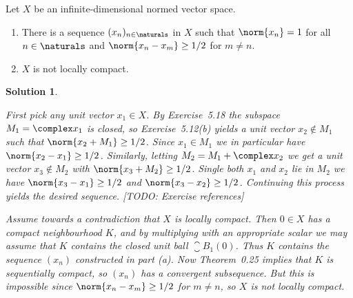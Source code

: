 \documentclass[article, a4paper, 11pt, oneside]{memoir}
\numberwithin{equation}{chapter}
\theoremstyle{nonumberplain}
\newtheorem{solution}{Solution}
\begin{document}
\begin{exerciseframed*}[19]
	Let $X$ be an infinite-dimensional normed vector space.
	\begin{enumerate}
		\item There is a sequence $(x_n)_{n\in\naturals}$ in $X$ such that $\norm{x_n} = 1$ for all $n \in \naturals$ and $\norm{x_n - x_m} \geq 1/2$ for $m \neq n$.
		\item $X$ is not locally compact.
	\end{enumerate}
\end{exerciseframed*}

\begin{solution}
\begin{solutionsec}
	\item First pick any unit vector $x_1 \in X$. By Exercise~5.18 the subspace $M_1 = \complex x_1$ is closed, so Exercise~5.12(b) yields a unit vector $x_2 \not\in M_1$ such that $\norm{x_2 + M_1} \geq 1/2$. Since $x_1 \in M_1$ we in particular have $\norm{x_2 - x_1} \geq 1/2$. Similarly, letting $M_2 = M_1 + \complex x_2$ we get a unit vector $x_3 \not\in M_2$ with $\norm{x_3 + M_2} \geq 1/2$. Single both $x_1$ and $x_2$ lie in $M_2$ we have $\norm{x_3 - x_1} \geq 1/2$ and $\norm{x_3 - x_2} \geq 1/2$. Continuing this process yields the desired sequence. [TODO: Exercise references]
	
	\item Assume towards a contradiction that $X$ is locally compact. Then $0 \in X$ has a compact neighbourhood $K$, and by multiplying with an appropriate scalar we may assume that $K$ contains the closed unit ball $\closure{B}_1(0)$. Thus $K$ contains the sequence $(x_n)$ constructed in part (a). Now Theorem~0.25 implies that $K$ is sequentially compact, so $(x_n)$ has a convergent subsequence. But this is impossible since $\norm{x_n - x_m} \geq 1/2$ for $m \neq n$, so $X$ is not locally compact.
\end{solutionsec}
\end{solution}
\end{document}
